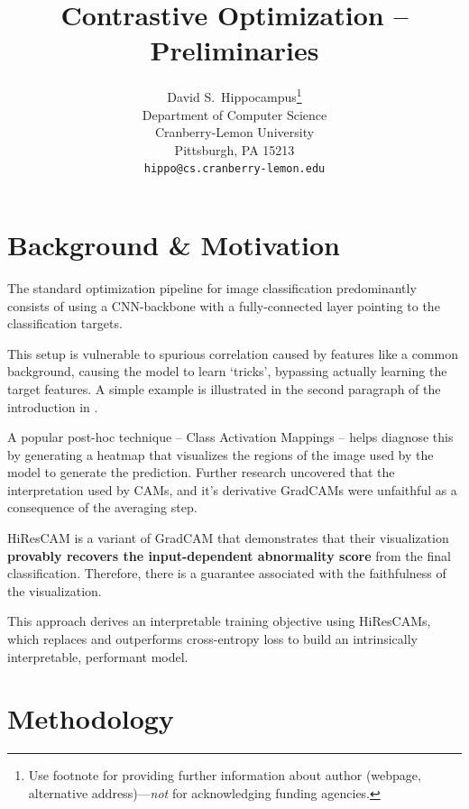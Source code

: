 \documentclass{article}
\title{Contrastive Optimization -- Preliminaries}
\author{%
  David S.~Hippocampus\thanks{Use footnote for providing further information
    about author (webpage, alternative address)---\emph{not} for acknowledging
    funding agencies.} \\
  Department of Computer Science\\
  Cranberry-Lemon University\\
  Pittsburgh, PA 15213 \\
  \texttt{hippo@cs.cranberry-lemon.edu} \\
}
\theoremstyle{plain}
\theoremstyle{definition}
\theoremstyle{remark}
\begin{document}
\maketitle




\section{Background \& Motivation}

The standard optimization pipeline for image classification predominantly consists of using a CNN-backbone with a fully-connected layer pointing to the classification targets.

This setup is vulnerable to spurious correlation caused by features like a common background, causing the model to learn `tricks', bypassing actually learning the target features. A simple example is illustrated in the second paragraph of the introduction in \cite{arjovsky2020invariantriskminimization}.

A popular post-hoc technique -- Class Activation Mappings \citep{zhou2016learning} -- helps diagnose this by generating a heatmap that visualizes the regions of the image used by the model to generate the prediction. Further research uncovered that the interpretation used by CAMs, and it's derivative GradCAMs were unfaithful as a consequence of the averaging step.

HiResCAM \citep{draelos2020use} is a variant of GradCAM \citep{selvaraju2017grad} that demonstrates that their visualization \textbf{provably recovers the input-dependent abnormality score} from the final classification. Therefore, there is a guarantee associated with the faithfulness of the visualization.

This approach derives an interpretable training objective using HiResCAMs, which replaces and outperforms cross-entropy loss to build an intrinsically interpretable, performant model.

\section{Methodology}
\end{document}
